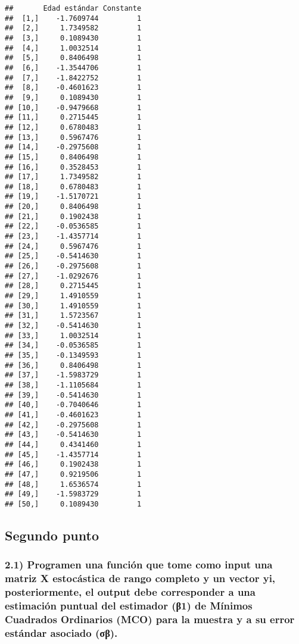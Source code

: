\documentclass[
]{article}
\begin{document}
\begin{verbatim}
##       Edad estándar Constante
##  [1,]    -1.7609744         1
##  [2,]     1.7349582         1
##  [3,]     0.1089430         1
##  [4,]     1.0032514         1
##  [5,]     0.8406498         1
##  [6,]    -1.3544706         1
##  [7,]    -1.8422752         1
##  [8,]    -0.4601623         1
##  [9,]     0.1089430         1
## [10,]    -0.9479668         1
## [11,]     0.2715445         1
## [12,]     0.6780483         1
## [13,]     0.5967476         1
## [14,]    -0.2975608         1
## [15,]     0.8406498         1
## [16,]     0.3528453         1
## [17,]     1.7349582         1
## [18,]     0.6780483         1
## [19,]    -1.5170721         1
## [20,]     0.8406498         1
## [21,]     0.1902438         1
## [22,]    -0.0536585         1
## [23,]    -1.4357714         1
## [24,]     0.5967476         1
## [25,]    -0.5414630         1
## [26,]    -0.2975608         1
## [27,]    -1.0292676         1
## [28,]     0.2715445         1
## [29,]     1.4910559         1
## [30,]     1.4910559         1
## [31,]     1.5723567         1
## [32,]    -0.5414630         1
## [33,]     1.0032514         1
## [34,]    -0.0536585         1
## [35,]    -0.1349593         1
## [36,]     0.8406498         1
## [37,]    -1.5983729         1
## [38,]    -1.1105684         1
## [39,]    -0.5414630         1
## [40,]    -0.7040646         1
## [41,]    -0.4601623         1
## [42,]    -0.2975608         1
## [43,]    -0.5414630         1
## [44,]     0.4341460         1
## [45,]    -1.4357714         1
## [46,]     0.1902438         1
## [47,]     0.9219506         1
## [48,]     1.6536574         1
## [49,]    -1.5983729         1
## [50,]     0.1089430         1
\end{verbatim}

\hypertarget{segundo-punto}{%
\subsection{Segundo punto}\label{segundo-punto}}

\hypertarget{programen-una-funciuxf3n-que-tome-como-input-una-matriz-x-estocuxe1stica-de-rango-completo-y-un-vector-yi-posteriormente-el-output-debe-corresponder-a-una-estimaciuxf3n-puntual-del-estimador-ux3b21-de-muxednimos-cuadrados-ordinarios-mco-para-la-muestra-y-a-su-error-estuxe1ndar-asociado-ux3c3ux3b2.}{%
\subsubsection{2.1) Programen una función que tome como input una matriz
X estocástica de rango completo y un vector yi, posteriormente, el
output debe corresponder a una estimación puntual del estimador (β1) de
Mínimos Cuadrados Ordinarios (MCO) para la muestra y a su error estándar
asociado
(σβ).}\label{programen-una-funciuxf3n-que-tome-como-input-una-matriz-x-estocuxe1stica-de-rango-completo-y-un-vector-yi-posteriormente-el-output-debe-corresponder-a-una-estimaciuxf3n-puntual-del-estimador-ux3b21-de-muxednimos-cuadrados-ordinarios-mco-para-la-muestra-y-a-su-error-estuxe1ndar-asociado-ux3c3ux3b2.}}
\end{document}
